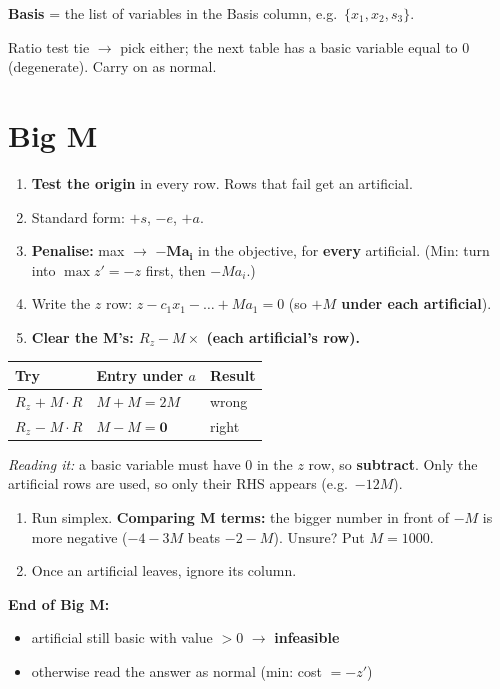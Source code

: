 \documentclass[10pt,a4paper]{article}
\newcommand{\reading}[1]{\textit{Reading it:} #1}
\newcommand{\thead}[1]{\textbf{#1}}
\begin{document}
\textbf{Basis} = the list of variables in the Basis column, e.g.\ $\{x_1, x_2, s_3\}$.

Ratio test tie $\to$ pick either; the next table has a basic variable equal to 0 (degenerate). Carry on as normal.

\section{Big M}

\begin{enumerate}
  \item \textbf{Test the origin} in every row. Rows that fail get an artificial.
  \item Standard form: $+s$, $-e$, $+a$.
  \item \textbf{Penalise:} max $\to$ $\mathbf{-Ma_i}$ in the objective, for \textbf{every} artificial. (Min: turn into $\max z' = -z$ first, then $-Ma_i$.)
  \item Write the $z$ row: $z - c_1x_1 - \dots + Ma_1 = 0$ (so \textbf{$+M$ under each artificial}).
  \item \textbf{Clear the M's: $R_z - M \times$ (each artificial's row).}
\end{enumerate}

\begin{tabular}{@{}l l l@{}}
\toprule
\thead{Try} & \thead{Entry under $a$} & \thead{Result} \\
\midrule
$R_z \;\mathbf{+}\; M\cdot R$ & $M + M = 2M$ & wrong \\
$R_z \;\mathbf{-}\; M\cdot R$ & $M - M = \mathbf{0}$ & right \\
\bottomrule
\end{tabular}

\reading{a basic variable must have 0 in the $z$ row, so \textbf{subtract}. Only the artificial rows are used, so only their RHS appears (e.g.\ $-12M$).}

\begin{enumerate}[resume]
  \item Run simplex. \textbf{Comparing M terms:} the bigger number in front of $-M$ is more negative ($-4 - 3M$ beats $-2 - M$). Unsure? Put $M = 1000$.
  \item Once an artificial leaves, ignore its column.
\end{enumerate}

\textbf{End of Big M:}
\begin{itemize}
  \item artificial still basic with value $> 0$ $\to$ \textbf{infeasible}
  \item otherwise read the answer as normal (min: cost $= -z'$)
\end{itemize}
\end{document}
